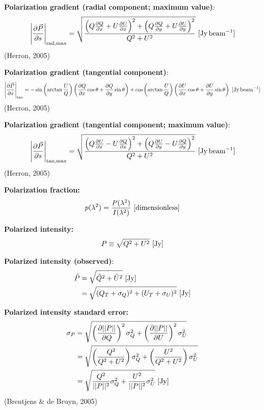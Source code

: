 \documentclass[a4paper,10pt]{article}
\begin{document}
{\noindent}\textbf{Polarization gradient (radial component; maximum value)}:
\begin{align*}
	\left\lvert\dfrac{\partial\vec{P}}{\partial s}\right\rvert_\mathrm{rad,max} = \sqrt{\frac{\left(Q\frac{\partial Q}{\partial x}+U\frac{\partial U}{\partial x}\right)^2 +\left(Q\frac{\partial Q}{\partial y}+U\frac{\partial U}{\partial y}\right)^2}{Q^2+U^2}} ~ [\rm Jy\,beam^{-1}]
\end{align*}
(Herron, 2005)

{\noindent}\textbf{Polarization gradient (tangential component)}:
\begin{align*}
	\left\lvert\dfrac{\partial\vec{P}}{\partial s}\right\rvert_\mathrm{tan} = -\sin\left(\arctan\frac{U}{Q}\right)\left(\frac{\partial Q}{\partial x}\cos\theta+\frac{\partial Q}{\partial y}\sin\theta\right) + \cos\left(\arctan\frac{U}{Q}\right)\left(\frac{\partial U}{\partial x}\cos\theta+\frac{\partial U}{\partial y}\sin\theta\right) ~ [\rm Jy\,beam^{-1}]
\end{align*}
(Herron, 2005)

{\noindent}\textbf{Polarization gradient (tangential component; maximum value)}:
\begin{align*}
	\left\lvert\dfrac{\partial\vec{P}}{\partial s}\right\rvert_\mathrm{tan,max} = \sqrt{\frac{\left(Q\frac{\partial U}{\partial x}-U\frac{\partial Q}{\partial x}\right)^2 +\left(Q\frac{\partial U}{\partial y}-U\frac{\partial Q}{\partial y}\right)^2}{Q^2+U^2}} ~ [\rm Jy\,beam^{-1}]
\end{align*}
(Herron, 2005)

{\noindent}\textbf{Polarization fraction:}
\begin{align*}
p(\lambda^2) = \dfrac{P(\lambda^2)}{I(\lambda^2)} ~ [{\rm dimensionless}]
\end{align*}

{\noindent}\textbf{Polarized intensity:}
\begin{align*}
    P\equiv\sqrt{Q^2+U^2} ~ [\rm Jy]
\end{align*}

{\noindent}\textbf{Polarized intensity (observed)}:
\begin{align*}
    \hat{P} &= \sqrt{\hat{Q}^2+\hat{U}^2} ~ [\rm Jy] \\
                &= \sqrt{(Q_T+\sigma_Q)^2+(U_T+\sigma_U)^2} ~ [\rm Jy]
\end{align*}

{\noindent}\textbf{Polarized intensity standard error:}
\begin{align*}
\sigma_P &= \sqrt{ \left(\dfrac{\partial\lvert\lvert P \rvert\rvert}{\partial Q}\right)^2\sigma_Q^2 + \left(\dfrac{\partial\lvert\lvert P \rvert\rvert}{\partial U}\right)^2\sigma_U^2 } \\
&= \sqrt{ \left(\dfrac{Q^2}{Q^2+U^2}\right)\sigma_Q^2 + \left(\dfrac{U^2}{Q^2+U^2}\right)\sigma_U^2 } \\
&= \sqrt{ \dfrac{Q^2}{\lvert\lvert P \rvert\rvert^2}\sigma_Q^2 + \dfrac{U^2}{\lvert\lvert P \rvert\rvert^2}\sigma_U^2 } ~ [\rm Jy]
\end{align*}
(Brentjens \& de Bruyn, 2005)
\end{document}
